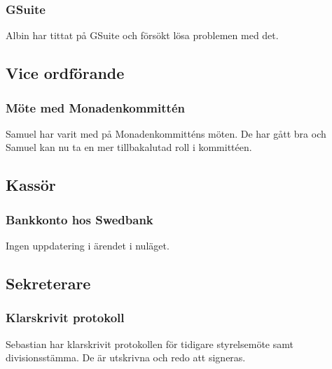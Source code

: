 \documentclass[protokoll]{dvd}
\begin{document}
\subsubsection{GSuite}
Albin har tittat på GSuite och försökt lösa problemen med det.






\newpage

\subsection{Vice ordförande}

\subsubsection{Möte med Monadenkommittén}
Samuel har varit med på Monadenkommitténs möten. De har gått bra och Samuel kan nu ta en mer tillbakalutad roll i kommittéen.






\newpage

\subsection{Kassör}

\subsubsection{Bankkonto hos Swedbank}

\begin{description}[style=multiline, widest=00.00, align=left, leftmargin=2.5cm]
    \item[2021-10-11] Ingen uppdatering i ärendet i nuläget.
\end{description}




\subsection{Sekreterare}

\subsubsection{Klarskrivit protokoll}
Sebastian har klarskrivit protokollen för tidigare styrelsemöte samt divisionsstämma. De är utskrivna och redo att signeras.
\end{document}
